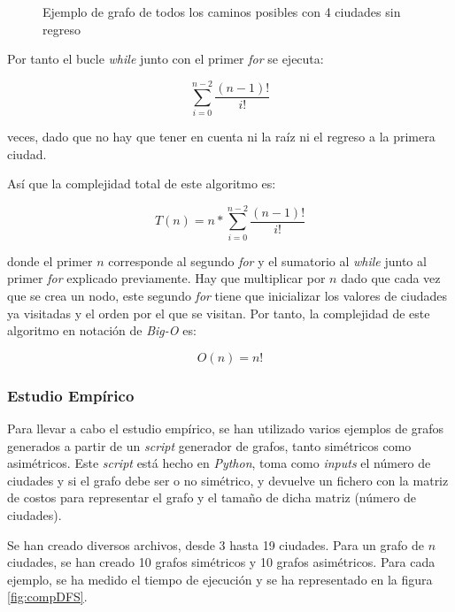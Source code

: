 \documentclass{uc3mpracticas}
\begin{document}
  \begin{figure}[!h]
    \caption{Ejemplo de grafo de todos los caminos posibles con 4 ciudades sin regreso}
    \label{fig:ejemploCaminos}
  \end{figure}
  
  
  Por tanto el bucle \textit{while} junto con el primer \textit{for} se ejecuta:
  
  $$ \displaystyle\sum_{i=0}^{n-2} \frac{(n-1)!}{i!} $$
  
  veces, dado que no hay que tener en cuenta ni la raíz ni el regreso a la primera ciudad.

  \vspace{2mm}

  Así que la complejidad total de este algoritmo es:

  $$ T(n) = n * \displaystyle\sum_{i=0}^{n-2} \frac{(n-1)!}{i!} $$

  donde el primer $n$ corresponde al segundo \textit{for} y el sumatorio al \textit{while} junto al primer \textit{for} explicado previamente. Hay que multiplicar por $n$ dado que cada vez que se crea un nodo, este segundo \textit{for} tiene que inicializar los valores de ciudades ya visitadas y el orden por el que se visitan. Por tanto, la complejidad de este algoritmo en notación de \textit{Big-O} es:

  $$ O(n) = n! $$
  
  
  \subsubsection{Estudio Empírico}
  
  Para llevar a cabo el estudio empírico, se han utilizado varios ejemplos de grafos generados a partir de un \textit{script} generador de grafos, tanto simétricos como asimétricos. Este \textit{script} está hecho en \textit{Python}, toma como \textit{inputs} el número de ciudades y si el grafo debe ser o no simétrico, y devuelve un fichero con la matriz de costos para representar el grafo y el tamaño de dicha matriz (número de ciudades).
  
  \vspace{2mm} 

  Se han creado diversos archivos, desde 3 hasta 19 ciudades. Para un grafo de $n$ ciudades, se han creado 10 grafos simétricos y 10 grafos asimétricos. Para cada ejemplo, se ha medido el tiempo de ejecución y se ha representado en la figura \ref{fig:compDFS}.
\end{document}
